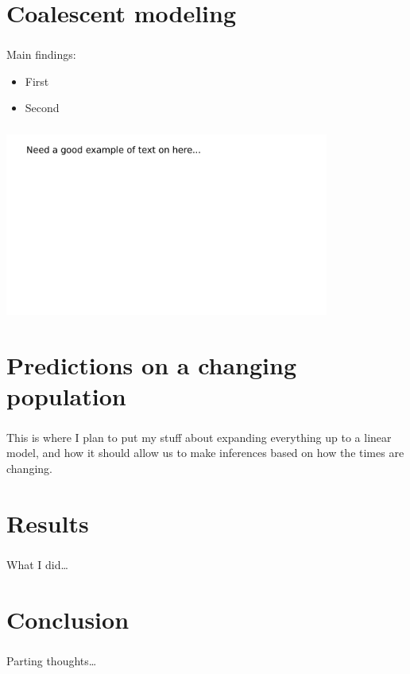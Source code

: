 \documentclass{beamer}
\begin{document}
\section{Coalescent modeling}

\begin{frame} \frametitle{\insertsection}

    Main findings:
    \begin{itemize}
        \item First
        \item Second
    \end{itemize}

\end{frame}

\begin{frame} \frametitle{\insertsection}
    \centering\includegraphics[width=0.8\textwidth]{images/example}
\end{frame}

\section{Predictions on a changing population}

\begin{frame} \frametitle{\insertsection}

    This is where I plan to put my stuff about
    expanding everything up to a linear model,
    and how it should allow us to make inferences
    based on how the times are changing.

\end{frame}

\section{Results}

\begin{frame} \frametitle{\insertsection}

    What I did\ldots

\end{frame}

\section{Conclusion}

\begin{frame} \frametitle{\insertsection}

    Parting thoughts\ldots

\end{frame}
\end{document}
